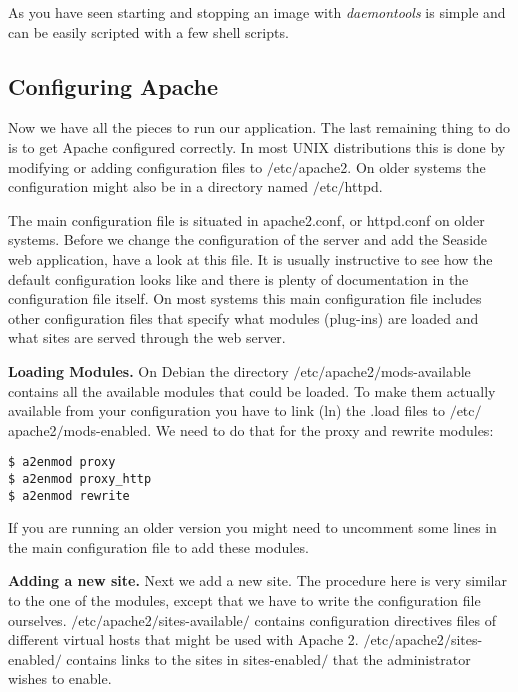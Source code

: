 \documentclass[a4paper,10pt,twoside]{book}
\newcommand{\ct}[1]{{\small\ttfamily\textup{#1}}}
\begin{document}
As you have seen starting and stopping an image with \textit{daemontools} is simple and can be easily scripted with a few shell scripts.

\subsection{Configuring Apache}
\label{book:advanced:deployment:deploymentapache:configureapache}

Now we have all the pieces to run our application. The last remaining thing to do is to get Apache configured correctly. In most UNIX distributions this is done by modifying or adding configuration files to \ct{$/$etc$/$apache2}. On older systems the configuration might also be in a directory named \ct{$/$etc$/$httpd}. 

The main configuration file is situated in \ct{apache2.conf}, or \ct{httpd.conf} on older systems. Before we change the configuration of the server and add the Seaside web application, have a look at this file. It is usually instructive to see how the default configuration looks like and there is plenty of documentation in the configuration file itself. On most systems this main configuration file includes other configuration files that specify what modules (plug-ins) are loaded and what sites are served through the web server.

\textbf{Loading Modules.} On Debian the directory \ct{$/$etc$/$apache2$/$mods-available} contains all the available modules that could be loaded. To make them actually available from your configuration you have to link (\ct{ln}) the \ct{.load} files to \ct{$/$etc$/$apache2$/$mods-enabled}. We need to do that for the proxy and rewrite modules:

\begin{lstlisting}
$ a2enmod proxy 
$ a2enmod proxy_http 
$ a2enmod rewrite 
\end{lstlisting}

If you are running an older version you might need to uncomment some lines in the main configuration file to add these modules.

\textbf{Adding a new site.} Next we add a new site. The procedure here is very similar to the one of the modules, except that we have to write the configuration file ourselves. \ct{$/$etc$/$apache2$/$sites-available$/$} contains configuration directives files of different virtual hosts that might be used with Apache 2. \ct{$/$etc$/$apache2$/$sites-enabled$/$} contains links to the sites in \ct{sites-enabled$/$} that the administrator wishes to enable. 
\end{document}
